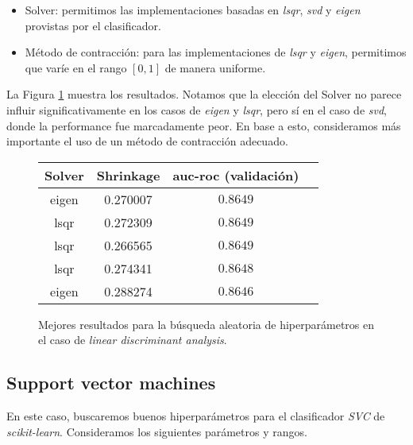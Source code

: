 \begin{itemize}
    \item Solver: permitimos las implementaciones basadas en \textit{lsqr}, \textit{svd} y \textit{eigen} provistas por el clasificador.
    \item Método de contracción: para las implementaciones de \textit{lsqr} y \textit{eigen}, permitimos que varíe en el rango $[0, 1]$ de manera uniforme.
\end{itemize}


La Figura \ref{lda} muestra los resultados. Notamos que la elección del Solver no parece influir significativamente en los casos de \textit{eigen} y \textit{lsqr}, pero sí en el caso de \textit{svd}, donde la performance fue marcadamente peor. En base a esto, consideramos más importante el uso de un método de contracción adecuado.

\vspace{0.5em}
\begin{figure}[!htbp]
    \begin{center}
        \begin{tabular}{ |c|c|c|c| } 
         \hline
        Solver   & Shrinkage & auc-roc (validación) \\
        \hline
        eigen                   &  0.270007          & $0.8649$  \\ 
        lsqr                    &  0.272309          & $0.8649$  \\
        lsqr                    &  0.266565          & $0.8649$  \\ 
        lsqr                    &  0.274341          & $0.8648$  \\
        eigen                   &  0.288274          & $0.8646$  \\ 
        \hline
        \end{tabular}
    \end{center}
    \caption{Mejores resultados para la búsqueda aleatoria de hiperparámetros en el caso de \textit{linear discriminant analysis}.} \label{lda}
\end{figure}

\subsection{Support vector machines} En este caso, buscaremos buenos hiperparámetros para el clasificador \textit{SVC} de \textit{scikit-learn}. Consideramos los siguientes parámetros y rangos. 

